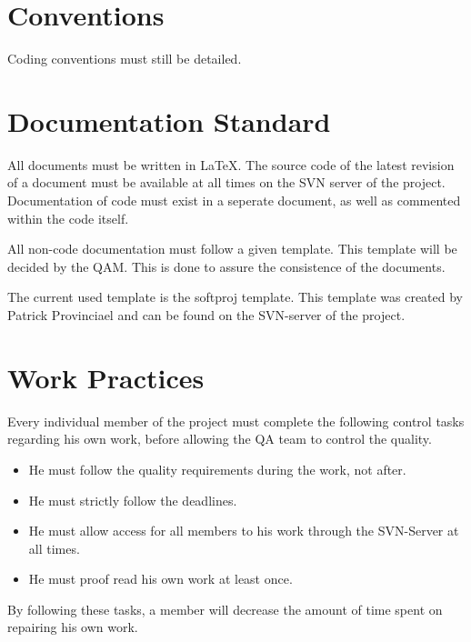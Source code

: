 \documentclass[salesmen, twoside]{softproj}
\begin{document}
\begin{projdoc}
\section{Conventions}
Coding conventions must still be detailed.

\section{Documentation Standard}
All documents must be written in LaTeX. The source code of the latest revision of a document must be available at all times on the SVN server of the project. Documentation of code must exist in a seperate document, as well as commented within the code itself.

All non-code documentation must follow a given template. This template will be decided by the QAM. This is done to assure the consistence of the documents.

The current used template is the softproj template. This template was created by Patrick Provinciael and can be found on the SVN-server of the project.

\section{Work Practices}
Every individual member of the project must complete the following control tasks regarding his own work, before allowing the QA team to control the quality.
\begin{itemize}
\item He must follow the quality requirements during the work, not after.
\item He must strictly follow the deadlines.
\item He must allow access for all members to his work through the SVN-Server at all times.
\item He must proof read his own work at least once.
\end{itemize}
By following these tasks, a member will decrease the amount of time spent on repairing his own work.


\end{projdoc}
\end{document}

